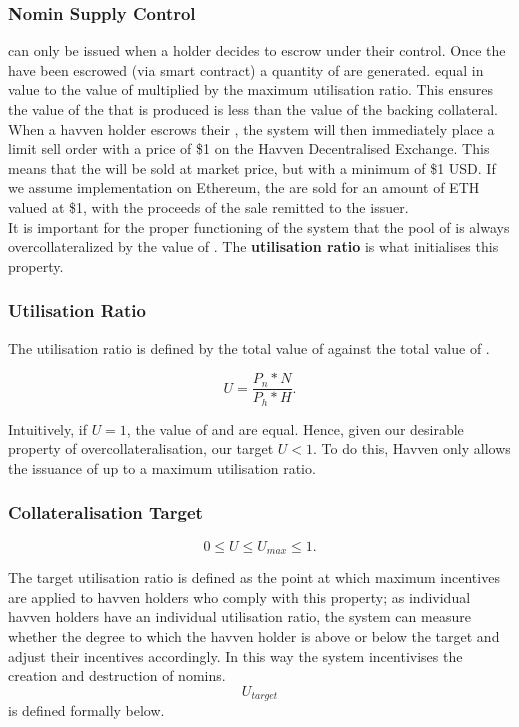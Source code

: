 \subsubsection{Nomin Supply Control}

\noindent \NOM{} can only be issued when a \HAV{} holder decides to escrow \HAV{} under their control. Once the \HAV{} have been escrowed (via smart contract) a quantity of \NOM{} are generated. equal in value to the value of \HAV{} multiplied by the maximum utilisation ratio. This ensures the value of the \NOM{} that is produced is less than the value of the backing \HAV{} collateral. \\

\noindent When a havven holder escrows their \HAV{}, the system will then immediately place a limit sell order with a price of \$1 on the Havven Decentralised Exchange. This means that the \NOM{} will be sold at market price, but with a minimum of \$1 USD. If we assume implementation on Ethereum, the \NOM{} are sold for an amount of ETH valued at \$1, with the proceeds of the sale remitted to the issuer. \\

\noindent It is important for the proper functioning of the system that the pool of \NOM{} is always overcollateralized by the value of \HAV{}. The \textbf{utilisation ratio} is what initialises this property.

\subsubsection{Utilisation Ratio}

\noindent The utilisation ratio is defined by the total value of \NOM{} against the total value of \HAV{}.

$$ U = \frac{P_n * N}{P_h * H}. $$

\noindent Intuitively, if $U = 1$, the value of \NOM{} and \HAV{} are equal. Hence, given our desirable property of overcollateralisation, our target $U <  1$. To do this, Havven only allows the issuance of \NOM{} up to a maximum utilisation ratio. \\

\subsubsection{Collateralisation Target}

$$ 0 \leq U \leq U_{max} \leq 1.$$

\noindent The target utilisation ratio is defined as the point at which maximum incentives are applied to havven holders who comply with this property; as individual havven holders have an individual utilisation ratio, the system can measure whether the degree to which the havven holder is above or below the target and adjust their incentives accordingly. In this way the system incentivises the creation and destruction of nomins. $$U_{target}$$ is defined formally below. \\

